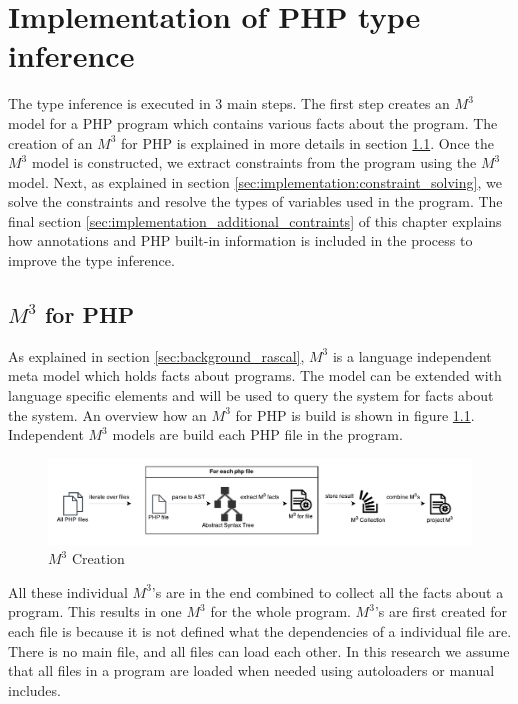 \documentclass[../main.tex]{subfiles}
\begin{document}
    \chapter{Implementation of PHP type inference}\label{ch:inference_implementation}

    The type inference is executed in 3 main steps.
    The first step creates an $M^3$ model for a PHP program which contains various facts about the program. 
    The creation of an $M^3$ for PHP is explained in more details in section \ref{sec:m3_for_php}.
    Once the $M^3$ model is constructed, we extract constraints from the program using the $M^3$ model.
    Next, as explained in section \ref{sec:implementation:constraint_solving}, we solve the constraints and resolve the types of variables used in the program.
    The final section \ref{sec:implementation_additional_contraints} of this chapter explains how annotations and PHP built-in information is included in the process to improve the type inference.
    
    \section{$M^3$ for PHP}\label{sec:m3_for_php}
    As explained in section \ref{sec:background_rascal}, $M^3$ is a language independent meta model which holds facts about programs.
    The model can be extended with language specific elements and will be used to query the system for facts about the system.
    An overview how an $M^3$ for PHP is build is shown in figure \ref{fig:research_m3_creation}.
    Independent $M^3$ models are build each PHP file in the program.
    
    \begin{figure}[H]
        \centerline{\includegraphics{Diagrams/M3Creation.pdf}}
        \caption{$M^3$ Creation}
        \label{fig:research_m3_creation}
    \end{figure}
    
    All these individual $M^3$'s are in the end combined to collect all the facts about a program.
    This results in one $M^3$ for the whole program.
    $M^3$'s are first created for each file is because it is not defined what the dependencies of a individual file are.
    There is no main file, and all files can load each other.
    In this research we assume that all files in a program are loaded when needed using autoloaders or manual includes.
    
\end{document}
